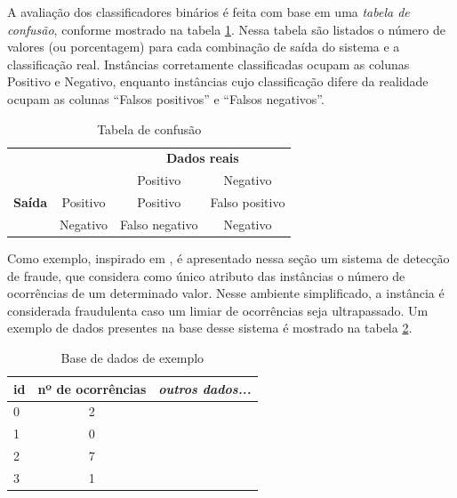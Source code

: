 A avaliação dos classificadores binários é feita com base em uma \emph{tabela de confusão}, conforme mostrado na tabela \ref{fraud:confusion}. Nessa tabela são listados o número de valores (ou porcentagem) para cada combinação de saída do sistema e a classificação real. Instâncias corretamente classificadas ocupam as colunas Positivo e Negativo, enquanto instâncias cujo classificação difere da realidade ocupam as colunas ``Falsos positivos'' e ``Falsos negativos''.

\renewcommand{\arraystretch}{1.5}
\vspace{2mm}
\begin{table}[h!]
    \caption{Tabela de confusão}
    \centering
    \begin{tabular}{c l c c}
        & & \multicolumn{2}{c}{\textbf{Dados reais}} \\
        \multirow{3}{5mm}{\begin{sideways}\parbox{20mm}{\textbf{Saída}}\end{sideways}} & \multicolumn{1}{c|}{} & Positivo & Negativo \\
        \cline{2-4}
        & \multicolumn{1}{c|}{Positivo} & Positivo & Falso positivo\\
        & \multicolumn{1}{c|}{Negativo} & Falso negativo & Negativo\\
    \end{tabular}
    \label{fraud:confusion}
\end{table}
\vspace{2mm}

Como exemplo, inspirado em \citet{Bewick2004}, é apresentado nessa seção um sistema de detecção de fraude, que considera como único atributo das instâncias o número de ocorrências de um determinado valor. Nesse ambiente simplificado, a instância é considerada fraudulenta caso um limiar de ocorrências seja ultrapassado. Um exemplo de dados presentes na base desse sistema é mostrado na tabela \ref{fraud:ex_data}.

\renewcommand{\arraystretch}{1.5}
\vspace{2mm}
\begin{table}[h!]
    \caption{Base de dados de exemplo}
    \centering
    \begin{tabular}{l|c|l}
        id & nº de ocorrências & \emph{outros dados...} \\
        \hline
        0 & 2           & \\
        1 & 0           & \\
        2 & 7           & \\
        3 & 1           & \\
    \end{tabular}
    \label{fraud:ex_data}
\end{table}
\vspace{2mm}

